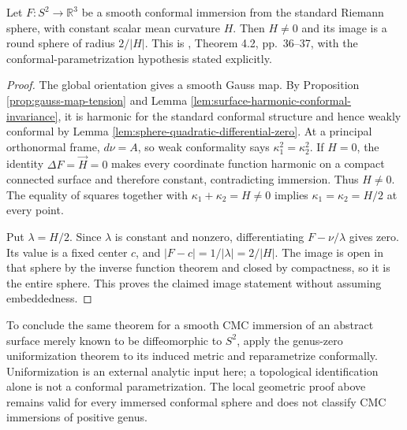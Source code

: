\begin{theorem}\label{thm:hopf-cmc-conformal-sphere}
Let $F:S^2\to\mathbb R^3$ be a smooth conformal immersion from the standard Riemann sphere, with constant scalar mean curvature $H$. Then $H\ne0$ and its image is a round sphere of radius $2/|H|$. This is \cite{Hel01}, Theorem 4.2, pp.~36--37, with the conformal-parametrization hypothesis stated explicitly.
\end{theorem}
\begin{proof}
The global orientation gives a smooth Gauss map. By Proposition \ref{prop:gauss-map-tension} and Lemma \ref{lem:surface-harmonic-conformal-invariance}, it is harmonic for the standard conformal structure and hence weakly conformal by Lemma \ref{lem:sphere-quadratic-differential-zero}. At a principal orthonormal frame, $d\nu=A$, so weak conformality says $\kappa_1^2=\kappa_2^2$. If $H=0$, the identity $\Delta F=\vec H=0$ makes every coordinate function harmonic on a compact connected surface and therefore constant, contradicting immersion. Thus $H\ne0$. The equality of squares together with $\kappa_1+\kappa_2=H\ne0$ implies $\kappa_1=\kappa_2=H/2$ at every point.

Put $\lambda=H/2$. Since $\lambda$ is constant and nonzero, differentiating $F-\nu/\lambda$ gives zero. Its value is a fixed center $c$, and $|F-c|=1/|\lambda|=2/|H|$. The image is open in that sphere by the inverse function theorem and closed by compactness, so it is the entire sphere. This proves the claimed image statement without assuming embeddedness.
\end{proof}

\begin{remark}\label{rem:hopf-uniformization-input}
To conclude the same theorem for a smooth CMC immersion of an abstract surface merely known to be diffeomorphic to $S^2$, apply the genus-zero uniformization theorem to its induced metric and reparametrize conformally. Uniformization is an external analytic input here; a topological identification alone is not a conformal parametrization. The local geometric proof above remains valid for every immersed conformal sphere and does not classify CMC immersions of positive genus.
\end{remark}
